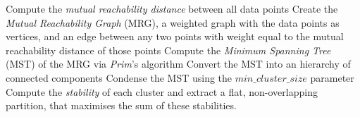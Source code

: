 \begin{algorithmic}[1]
\State Compute the \textit{mutual reachability distance} between all data points
\State Create the \textit{Mutual Reachability Graph} (MRG), a weighted graph with the data points as vertices, and an edge between any two points with weight equal to the mutual reachability distance of those points
\State Compute the \textit{Minimum Spanning Tree} (MST) of the MRG via \textit{Prim}'s algorithm
\State Convert the MST into an hierarchy of connected components
\State Condense the MST using the $min\_cluster\_size$ parameter
\State Compute the \textit{stability} of each cluster and extract a flat, non-overlapping partition, that maximises the sum of these stabilities.
\end{algorithmic}
